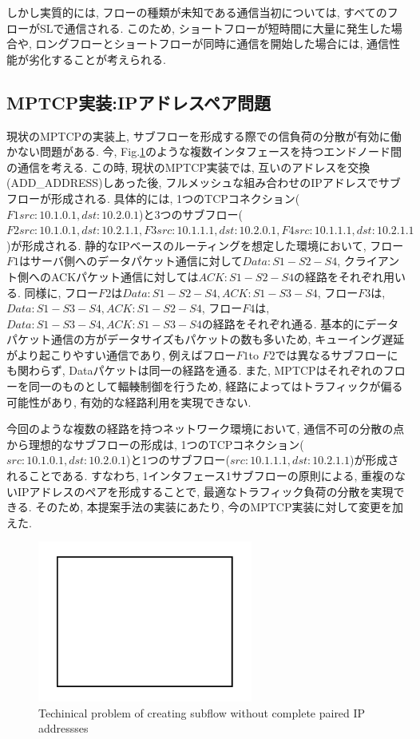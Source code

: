 しかし実質的には, フローの種類が未知である通信当初については, すべてのフローがSLで通信される. 
このため, ショートフローが短時間に大量に発生した場合や, ロングフローとショートフローが同時に通信を開始した場合には, 通信性能が劣化することが考えられる. 

\subsection{MPTCP実装:IPアドレスペア問題}
現状のMPTCPの実装上, サブフローを形成する際での信負荷の分散が有効に働かない問題がある. 
今, Fig.\ref{fig:mptcp_pair}のような複数インタフェースを持つエンドノード間の通信を考える. 
この時, 現状のMPTCP実装では, 互いのアドレスを交換(ADD\_ADDRESS)しあった後,
フルメッシュな組み合わせのIPアドレスでサブフローが形成される. 
具体的には, 1つのTCPコネクション($F1{src:10.1.0.1, dst:10.2.0.1}$)と3つのサブフロー($F2{src:10.1.0.1,
dst:10.2.1.1}, F3{src:10.1.1.1, dst:10.2.0.1}, F4{src:10.1.1.1,
dst:10.2.1.1}$)が形成される. 
静的なIPベースのルーティングを想定した環境において, フロー$F1$はサーバ側へのデータパケット通信に対して$Data:S1-S2-S4$,
クライアント側へのACKパケット通信に対しては$ACK:S1-S2-S4$の経路をそれぞれ用いる. 
同様に, フロー$F2$は$Data:S1-S2-S4, ACK:S1-S3-S4$, フロー$F3$は, $Data:S1-S3-S4,
ACK:S1-S2-S4$, フロー$F4$は, $Data:S1-S3-S4, ACK:S1-S3-S4$の経路をそれぞれ通る. 
基本的にデータパケット通信の方がデータサイズもパケットの数も多いため, キューイング遅延がより起こりやすい通信であり, 例えばフロー$F1$to
$F2$では異なるサブフローにも関わらず, Dataパケットは同一の経路を通る. 
また, MPTCPはそれぞれのフローを同一のものとして輻輳制御を行うため, 経路によってはトラフィックが偏る可能性があり, 有効的な経路利用を実現できない. 

今回のような複数の経路を持つネットワーク環境において, 通信不可の分散の点から理想的なサブフローの形成は,
1つのTCPコネクション(${src:10.1.0.1, dst:10.2.0.1}$)と1つのサブフロー(${src:10.1.1.1,
dst:10.2.1.1}$)が形成されることである. 
すなわち, 1インタフェース1サブフローの原則による, 重複のないIPアドレスのペアを形成することで, 最適なトラフィック負荷の分散を実現できる. 
そのため, 本提案手法の実装にあたり, 今のMPTCP実装に対して変更を加えた. 


\begin{figure}[t]
    \begin{center}
    \includegraphics[autoebb, width=200pt]{./img/test.pdf}
    \caption{Techinical problem of creating subflow without complete paired IP
    addressses}
    \label{fig:mptcp_pair}
    \end{center}
\end{figure}

